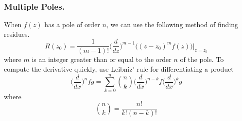 \documentclass[../main.tex]{subfiles}
\begin{document}
\subsubsection*{Multiple Poles.} When $f (z)$ has a pole of order $n$, we can use the following
method of finding residues.
\begin{equation*}
    R(z_0)=\frac{1}{(m-1)!}\biggl(\frac{d}{dz}\biggr)^{m-1}\biggl((z-z_0)^mf(z)\biggr)\bigg|_{z=z_0}
\end{equation*}
where $m$ is an integer greater than or equal to the order $n$ of the pole. To compute the derivative quickly, use Leibniz’ rule for differentiating a product
\begin{equation*}
    \biggl(\frac{d}{dx}\biggr)^{n}fg=\sum_{k=0}^n {n \choose k}\biggl(\frac{d}{dx}\biggr)^{n-k} f \biggl(\frac{d}{dx}\biggr)^{k}g
\end{equation*}
where
\begin{equation*}
    {n \choose k}={\frac{n!}{k! (n-k)!}}
\end{equation*}
\end{document}

